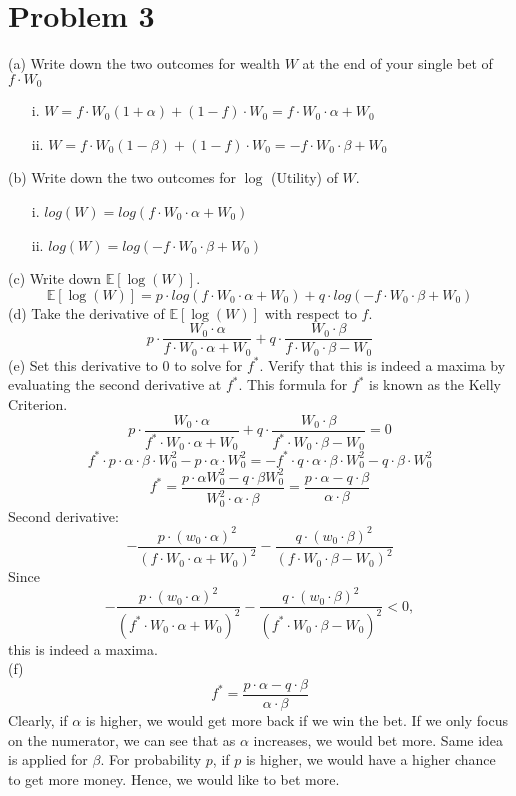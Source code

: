 \documentclass{article}
\begin{document}
\section*{Problem 3}
(a) Write down the two outcomes for wealth $W$ at the end of your single bet of $f \cdot W_{0}$
\begin{itemize}
\item[i.] $W=f\cdot W_0 (1+\alpha) + (1-f)\cdot W_0 = f\cdot W_0 \cdot \alpha + W_0$
\item[ii.] $W=f\cdot W_0 (1-\beta) + (1-f)\cdot W_0 = - f\cdot W_0 \cdot \beta + W_0$
\end{itemize}
(b) Write down the two outcomes for $\log$ (Utility) of $W$.
\begin{itemize}
\item[i.] $log(W) =log(f\cdot W_0 \cdot \alpha + W_0)$
\item[ii.] $log(W)=log(-f\cdot W_0 \cdot \beta + W_0)$
\end{itemize}
(c) Write down $\mathbb{E}[\log (W)]$.
$$\mathbb{E}[\log (W)] = p\cdot log(f\cdot W_0 \cdot \alpha + W_0) + q \cdot log(-f\cdot W_0 \cdot \beta + W_0)$$
(d) Take the derivative of $\mathbb{E}[\log (W)]$ with respect to $f$.\\
$$ p \cdot \frac{W_0 \cdot \alpha}{f\cdot W_0 \cdot \alpha + W_0} + q \cdot \frac{W_0 \cdot \beta}{f\cdot W_0 \cdot \beta - W_0}$$
(e) Set this derivative to 0 to solve for $f^{*}$. Verify that this is indeed a maxima by evaluating the second derivative at $f^{*}$. This formula for $f^{*}$ is known as the Kelly Criterion.\\
$$ p \cdot \frac{W_0 \cdot \alpha}{f^*\cdot W_0 \cdot \alpha + W_0} + q \cdot \frac{W_0 \cdot \beta}{f^*\cdot W_0 \cdot \beta - W_0} = 0$$
$$ f^*\cdot p \cdot\alpha \cdot \beta \cdot W_{0}^{2} - p \cdot  \alpha \cdot W_{0}^{2} = -f^* \cdot q  \cdot \alpha \cdot \beta \cdot W_{0}^{2} - q \cdot \beta \cdot W_{0}^{2} $$
$$f^* = \frac{p \cdot \alpha W_{0}^{2}-q\cdot \beta W_{0}^{2}}{W_{0}^{2}\cdot \alpha \cdot \beta} = \frac{p \cdot \alpha -q\cdot \beta }{\alpha \cdot \beta}$$
Second derivative:
$$-\frac{p\cdot (w_0\cdot\alpha)^2}{(f\cdot W_0 \cdot \alpha+W_0)^2}-\frac{q\cdot (w_0\cdot\beta)^2}{(f\cdot W_0 \cdot \beta-W_0)^2}$$
Since
$$-\frac{p\cdot (w_0\cdot\alpha)^2}{(f^{*}\cdot W_0 \cdot \alpha+W_0)^2}-\frac{q\cdot (w_0\cdot\beta)^2}{(f^{*}\cdot W_0 \cdot \beta-W_0)^2} < 0,$$
this is indeed a maxima.\\
(f)$$ f^* = \frac{p \cdot \alpha -q\cdot \beta }{\alpha \cdot \beta} $$
 Clearly, if $\alpha$ is higher, we would get more back if we win the bet. If we only focus on the numerator, we can see that as $\alpha$ increases, we would bet more. Same idea is applied for $\beta$. For probability $p$, if $p$ is higher, we would have a higher chance to get more money. Hence, we would like to bet more.
\end{document}
